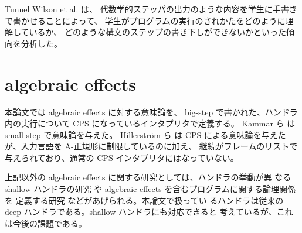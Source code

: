 Tunnel Wilson et al. \cite{tunnell18} は、
代数学的ステッパの出力のような内容を学生に手書きで書かせることによって、
学生がプログラムの実行のされかたをどのように理解しているか、
どのような構文のステップの書き下しができないかといった傾向を分析した。

\section{algebraic effects}
\label{section:algebraic effects__related}

本論文では algebraic effects に対する意味論を、
big-step で書かれた、ハンドラ内の実行について CPS になっているインタプリタで定義する。
Kammar ら \cite{10.1145/2500365.2500590} は small-step で意味論を与えた。
Hillerstr{\"o}m ら \cite{e6cb0c3222794e48bf38cf44e46fe4aa} は
CPS による意味論を与えたが、入力言語を A-正規形に制限しているのに加え、
継続がフレームのリストで与えられており、通常の CPS インタプリタにはなっていない。

上記以外の algebraic effects に関する研究としては、ハンドラの挙動が異
なる shallow ハンドラの研究 \cite{10.1007/978-3-030-02768-1_22} や
algebraic effects を含むプログラムに関する論理関係を
定義する研究 \cite{10.1145/3158096} などがあげられる。本論文で扱ってい
るハンドラは従来の deep ハンドラである。shallow ハンドラにも対応できると
考えているが、これは今後の課題である。
